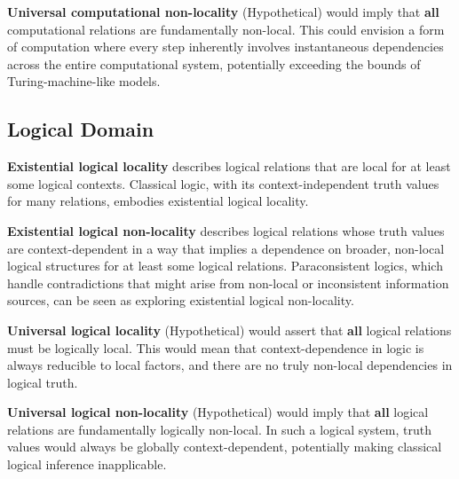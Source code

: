 \begin{definition}
	\textbf{Universal computational non-locality} (Hypothetical) would imply that \textbf{all} computational relations are fundamentally non-local.  This could envision a form of computation where every step inherently involves instantaneous dependencies across the entire computational system, potentially exceeding the bounds of Turing-machine-like models.
\end{definition}

\subsection{Logical Domain}

\begin{definition}
	\textbf{Existential logical locality} describes logical relations that are local for at least some logical contexts. Classical logic, with its context-independent truth values for many relations, embodies existential logical locality.
\end{definition}

\begin{definition}
	\textbf{Existential logical non-locality} describes logical relations whose truth values are context-dependent in a way that implies a dependence on broader, non-local logical structures for at least some logical relations. Paraconsistent logics, which handle contradictions that might arise from non-local or inconsistent information sources, can be seen as exploring existential logical non-locality.
\end{definition}

\begin{definition}
	\textbf{Universal logical locality} (Hypothetical) would assert that \textbf{all} logical relations must be logically local. This would mean that context-dependence in logic is always reducible to local factors, and there are no truly non-local dependencies in logical truth.
\end{definition}

\begin{definition}
	\textbf{Universal logical non-locality} (Hypothetical) would imply that \textbf{all} logical relations are fundamentally logically non-local. In such a logical system, truth values would always be globally context-dependent, potentially making classical logical inference inapplicable.
\end{definition}

